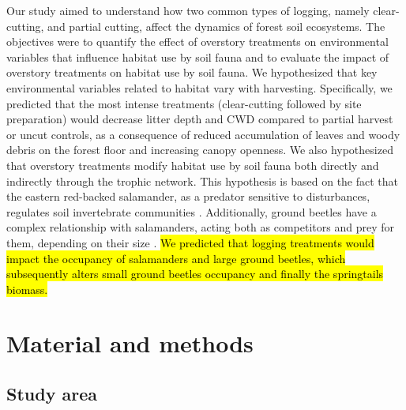 Our study aimed to understand how two common types of logging, namely clear-cutting, and partial cutting, affect the dynamics of forest soil ecosystems. 
The objectives were to quantify the effect of overstory treatments on environmental variables that influence habitat use by soil fauna 
and to evaluate the impact of overstory treatments on habitat use by soil fauna. 
We hypothesized that key environmental variables related to habitat vary with harvesting. 
Specifically, we predicted that the most intense treatments (clear-cutting followed by site preparation) would decrease litter depth and CWD compared to partial harvest or uncut controls, 
as a consequence of reduced accumulation of leaves and woody debris on the forest floor and increasing canopy openness. 
We also hypothesized that overstory treatments modify habitat use by soil fauna both directly and indirectly through the trophic network. 
This hypothesis is based on the fact that the eastern red-backed salamander, as a predator sensitive to disturbances, regulates soil invertebrate communities \citep{Wyman1998Experimentalassessment,MichaelWalton2005Salamandersforestfloor,Walton2006Salamandersforestfloor,Walton2013Topdownregulation,Hickerson2017Easternredbacked}. 
Additionally, ground beetles have a complex relationship with salamanders, acting both as competitors and prey for them, depending on their size \citep{Jaeger1980MicrohabitatsTerrestrial,loveiEcologyBehaviorGround1996,Gall2003BehavioralInteractions}. 
\hl{We predicted that logging treatments would impact the occupancy of salamanders and large ground beetles, which subsequently alters small ground beetles occupancy and finally the springtails biomass. }


\section*{Material and methods}
\label{sec:matmet1}

\subsection*{Study area}
\label{subsec:area}


